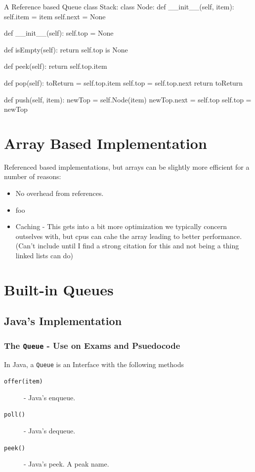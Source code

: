 \begin{pycode}{A Reference based Queue}
class Stack:
	class Node:
		def __init__(self, item):
			self.item = item
			self.next = None

	def __init__(self):
		self.top = None

	def isEmpty(self):
		return self.top is None
	
	def peek(self):
		return self.top.item
	
	def pop(self):
		toReturn = self.top.item
		self.top = self.top.next
		return toReturn
	
	def push(self, item):
		newTop = self.Node(item)
		newTop.next = self.top
		self.top = newTop
\end{pycode}




\section{Array Based Implementation}
Referenced based implementations, but arrays can be slightly more efficient for a number of reasons:



\begin{itemize}
	\item No overhead from references.
	\item foo
	\item Caching - This gets into a bit more optimization we typically concern outselves with, but cpus can cahe the array leading to better performance.  (Can't include until I find a strong citation for this and not being a thing linked lists can do)

\end{itemize}

\section{Built-in Queues}
\subsection{Java's Implementation}

\subsubsection{The \texttt{Queue} - Use on Exams and Psuedocode}
In Java, a \texttt{Queue} is an Interface with the following methods

\begin{description}
	\item[\texttt{offer(item)}] - Java's enqueue.
	\item[\texttt{poll()}] - Java's dequeue.
	\item[\texttt{peek()}] - Java's peek.  A peak name.
\end{description}

